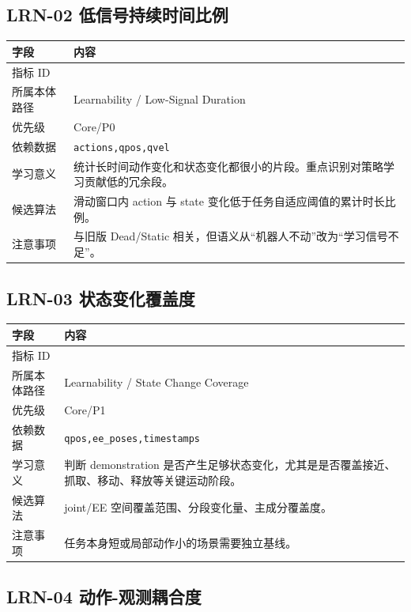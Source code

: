 \documentclass[UTF8,zihao=-4]{ctexart}
\newcommand{\Code}[1]{\texttt{#1}}
\newcommand{\MID}[1]{\texttt{\seqsplit{#1}}}
\begin{document}
\subsection{LRN-02 低信号持续时间比例}

\begin{longtable}{L{3.6cm} L{9.6cm}}
\toprule
字段 & 内容 \\
\midrule
指标 ID & \MID{LRN-02} \\
所属本体路径 & Learnability / Low-Signal Duration \\
优先级 & Core/P0 \\
依赖数据 & \Code{actions,qpos,qvel} \\
学习意义 & 统计长时间动作变化和状态变化都很小的片段。重点识别对策略学习贡献低的冗余段。 \\
候选算法 & 滑动窗口内 action 与 state 变化低于任务自适应阈值的累计时长比例。 \\
注意事项 & 与旧版 Dead/Static 相关，但语义从“机器人不动”改为“学习信号不足”。 \\
\bottomrule
\end{longtable}

\subsection{LRN-03 状态变化覆盖度}

\begin{longtable}{L{3.6cm} L{9.6cm}}
\toprule
字段 & 内容 \\
\midrule
指标 ID & \MID{LRN-03} \\
所属本体路径 & Learnability / State Change Coverage \\
优先级 & Core/P1 \\
依赖数据 & \Code{qpos,ee\_poses,timestamps} \\
学习意义 & 判断 demonstration 是否产生足够状态变化，尤其是是否覆盖接近、抓取、移动、释放等关键运动阶段。 \\
候选算法 & joint/EE 空间覆盖范围、分段变化量、主成分覆盖度。 \\
注意事项 & 任务本身短或局部动作小的场景需要独立基线。 \\
\bottomrule
\end{longtable}

\subsection{LRN-04 动作-观测耦合度}
\end{document}
